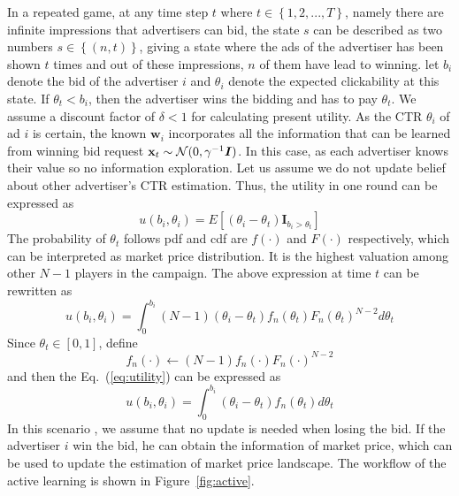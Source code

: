 In a repeated game, at any time step $t$ where $t\in \left \{ 1,2,...,T\right \}$, namely there are infinite impressions that advertisers can bid, the state $s$ can be described as two numbers $s\in \left \{(n,t)  \right \}$, giving a state where the ads of the advertiser has been shown $t$ times and out of these impressions, $n$ of them have lead to winning. let $b_i$ denote the bid of the advertiser $i$ and $\theta_{i}$ denote the expected clickability at this state. If $\theta_t<b_{i}$, then the advertiser wins the bidding and has to pay $\theta_t$. We assume a discount factor of $\delta<1$ for calculating present utility. As the CTR $\theta_i$ of ad $i$ is certain, the known $\mathbf{w}_i$  incorporates all the information that can be learned from winning bid request $\mathbf{x}_t\sim \mathcal{N}(0,\gamma \boldsymbol^{-1}\boldsymbol{I})$. In this case, as each advertiser knows their value so no information exploration. Let us assume we do not update belief about other advertiser's CTR estimation. Thus, the utility in one round can be expressed as
\begin{equation}
u(b_i,\theta_i)=E[(\theta_i-\theta_t)\bm{I}_{b_i>\theta_t}]
\end{equation}
The probability of $\theta_t$ follows pdf and cdf are $f(\cdot)$ and $F(\cdot)$ respectively, which can be interpreted as market price distribution. It is the highest valuation among other $N-1$ players in the campaign. The above expression at time $t$ can be rewritten as
\begin{equation}
\label{eq:utility}
u(b_i,\theta_i)=\int_{0}^{b_i}(N-1)(\theta_i-\theta_t)f_{n}(\theta_t)F_{n}(\theta_t)^{N-2}d\theta_t
\end{equation}
Since $\theta_t \in [0,1]$, define 
\begin{equation}
f_{n}(\cdot) \leftarrow (N-1)f_{n}(\cdot)F_{n}(\cdot)^{N-2}
\end{equation}
and then the Eq.~(\ref{eq:utility}) can be expressed as
\begin{equation}
\label{eq:utility}
u(b_i,\theta_i) = \int_{0}^{b_i}(\theta_i-\theta_t)f_{n}(\theta_t)d\theta_t
\end{equation}
In this scenario \cite{menezes2005introduction} , we assume that no update is needed when losing the bid. If the advertiser $i$ win the bid, he can obtain the information of market price, which can be used to update the estimation of market price landscape. The workflow of the active learning is shown in Figure~\ref{fig:active}. 

